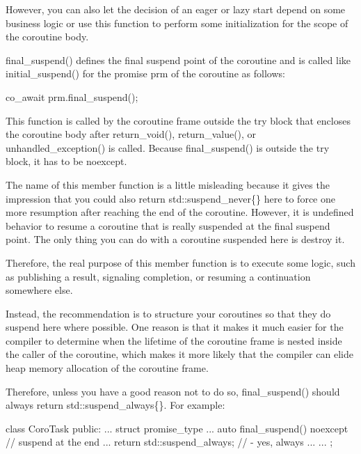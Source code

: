 However, you can also let the decision of an eager or lazy start depend on some business logic or use this function to perform some initialization for the scope of the coroutine body.


final\_suspend() defines the final suspend point of the coroutine and is called like initial\_suspend() for the promise prm of the coroutine as follows:

\begin{cpp}
co_await prm.final_suspend();
\end{cpp}

This function is called by the coroutine frame outside the try block that encloses the coroutine body after return\_void(), return\_value(), or unhandled\_exception() is called. Because final\_suspend() is outside the try block, it has to be noexcept.

The name of this member function is a little misleading because it gives the impression that you could also return std::suspend\_never\{\} here to force one more resumption after reaching the end of the coroutine. However, it is undefined behavior to resume a coroutine that is really suspended at the final suspend point. The only thing you can do with a coroutine suspended here is destroy it.

Therefore, the real purpose of this member function is to execute some logic, such as publishing a result, signaling completion, or resuming a continuation somewhere else.

Instead, the recommendation is to structure your coroutines so that they do suspend here where possible. One reason is that it makes it much easier for the compiler to determine when the lifetime of the coroutine frame is nested inside the caller of the coroutine, which makes it more likely that the compiler can elide heap memory allocation of the coroutine frame.

Therefore, unless you have a good reason not to do so, final\_suspend() should always return std::suspend\_always\{\}. For example:

\begin{cpp}
class CoroTask {
	public:
	...
	struct promise_type {
		...
		auto final_suspend() noexcept { // suspend at the end
			...
			return std::suspend_always{}; // - yes, always
		}
		...
	}
	...
};
\end{cpp}


